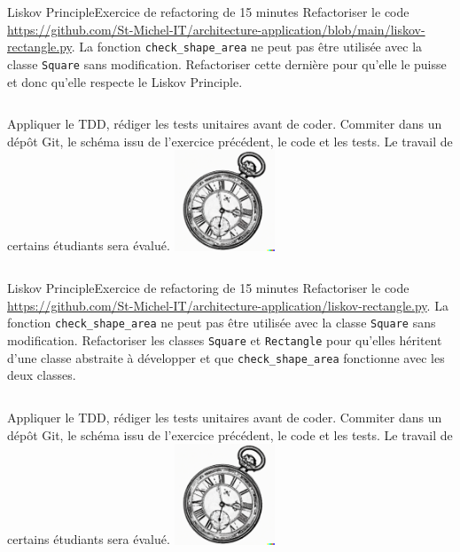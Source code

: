 \documentclass{beamer}
\begin{document}
    \begin{frame}{Liskov Principle}{Exercice \execcounterdispinc{} de refactoring de 15 minutes}
        Refactoriser le code \url{https://github.com/St-Michel-IT/architecture-application/blob/main/liskov-rectangle.py}.
        La fonction \lstinline{check_shape_area} ne peut pas être utilisée avec la classe \lstinline{Square} sans modification.
        Refactoriser cette dernière pour qu'elle le puisse et donc qu'elle respecte le Liskov Principle.
        \bigbreak
        \begin{columns}
            Appliquer le TDD, rédiger les tests unitaires avant de coder.
            \bigbreak
            Commiter dans un dépôt Git, le schéma issu de l'exercice précédent, le code et les tests.
            \bigbreak
            Le travail de certains étudiants sera évalué.
            \centering
            \includegraphics[width=3cm]{image/engraving-of-an-old-watch}
        \end{columns}
    \end{frame}

    \begin{frame}{Liskov Principle}{Exercice \execcounterdispinc{} de refactoring de 15 minutes}
        Refactoriser le code \url{https://github.com/St-Michel-IT/architecture-application/liskov-rectangle.py}.
        La fonction \lstinline{check_shape_area} ne peut pas être utilisée avec la classe \lstinline{Square} sans modification.
        Refactoriser les classes \lstinline{Square} et \lstinline{Rectangle} pour qu'elles héritent d'une classe abstraite à développer et que \lstinline{check_shape_area} fonctionne avec les deux classes.
        \bigbreak
        \begin{columns}
            Appliquer le TDD, rédiger les tests unitaires avant de coder.
            \bigbreak
            Commiter dans un dépôt Git, le schéma issu de l'exercice précédent, le code et les tests.
            \bigbreak
            Le travail de certains étudiants sera évalué.
            \centering
            \includegraphics[width=3cm]{image/engraving-of-an-old-watch}
        \end{columns}
    \end{frame}
\end{document}
